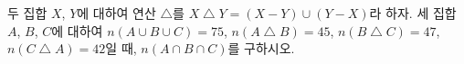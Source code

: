 두 집합 $X$, $Y$에 대하여 연산 $\triangle$를 $X\mathbin{\triangle}Y=(X-Y)\cup(Y-X)$라 하자. 세 집합 $A$, $B$, $C$에 대하여 $n(A\cup B\cup C)=75$, $n(A\mathbin{\triangle}B)=45$, $n(B\mathbin{\triangle}C)=47$, $n(C\mathbin{\triangle}A)=42$일 때, $n(A\cap B\cap C)$를 구하시오.
